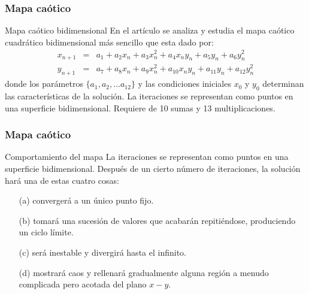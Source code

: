 \documentclass[10pt]{beamer}
\begin{document}
\begin{frame}
    \frametitle{Mapa caótico}
    \begin{block}{Mapa caótico bidimensional}
        \justifying
        En el artículo \cite{Sprott1993} se analiza y estudia el mapa caótico cuadrático bidimensional más sencillo que esta dado por:
        \begin{equation}
            \begin{array}{ccl}
                x_{n+1} & = &  a_{1} + a_{2}x_{n} + a_{3}x_{n}^{2} + a_{4}x_{n}y_{n} + a_{5}y_{n} + a_{6}y_{n}^{2}\\
                y_{n+1} & = &  a_{7} + a_{8}x_{n} + a_{9}x_{n}^{2} + a_{10}x_{n}y_{n} + a_{11}y_{n} + a_{12}y_{n}^{2}
            \end{array}
            \label{eq:mapa_caotico}
	    \end{equation}
	     donde los parámetros $\{a_{1}, a_{2}, \ldots a_{12}\}$ y las condiciones iniciales $x_{0}$ y $y_{0}$ determinan las características de la solución. La iteraciones se representan como puntos en una superficie bidimensional. Requiere de 10 sumas y 13 multiplicaciones. 
	\end{block}
\end{frame}

\begin{frame}
    \frametitle{Mapa caótico}
    \begin{block}{Comportamiento del mapa}
        \justifying
         La iteraciones se representan como puntos en una superficie bidimensional. Después de un cierto número de iteraciones, la solución hará una de estas cuatro cosas: 
            \begin{itemize}
                \item[(a)] convergerá a un único punto fijo.
                \item[(b)] tomará una sucesión de valores que acabarán repitiéndose, produciendo un ciclo límite.
                \item[(c)] será inestable y divergirá hasta el infinito.
                \item[(d)] mostrará caos y rellenará gradualmente alguna región a menudo complicada pero acotada del plano $x-y$.
            \end{itemize}                     
	\end{block}
\end{frame}
\end{document}
